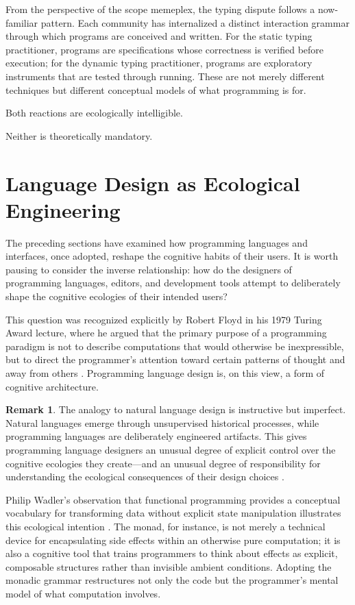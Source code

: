 \documentclass[11pt]{article}
\theoremstyle{definition}
\newtheorem{remark}{Remark}[section]
\begin{document}
From the perspective of the scope memeplex, the typing dispute follows
a now-familiar pattern. Each community has internalized a distinct
interaction grammar through which programs are conceived and written.
For the static typing practitioner, programs are specifications whose
correctness is verified before execution; for the dynamic typing
practitioner, programs are exploratory instruments that are tested
through running. These are not merely different techniques but different
conceptual models of what programming is for.

Both reactions are ecologically intelligible.

Neither is theoretically mandatory.

\section{Language Design as Ecological Engineering}

The preceding sections have examined how programming languages and
interfaces, once adopted, reshape the cognitive habits of their users.
It is worth pausing to consider the inverse relationship: how do the
designers of programming languages, editors, and development tools
attempt to deliberately shape the cognitive ecologies of their
intended users?

This question was recognized explicitly by Robert Floyd in his 1979
Turing Award lecture, where he argued that the primary purpose of a
programming paradigm is not to describe computations that would
otherwise be inexpressible, but to direct the programmer's attention
toward certain patterns of thought and away from others
\cite{floyd1979}. Programming language design is, on this view, a form
of cognitive architecture.

\begin{remark}
The analogy to natural language design is instructive but imperfect.
Natural languages emerge through unsupervised historical processes,
while programming languages are deliberately engineered artifacts.
This gives programming language designers an unusual degree of explicit
control over the cognitive ecologies they create---and an unusual degree
of responsibility for understanding the ecological consequences of their
design choices \cite{floyd1979,wadler1992}.
\end{remark}

Philip Wadler's observation that functional programming provides a
conceptual vocabulary for transforming data without explicit state
manipulation illustrates this ecological intention \cite{wadler1992}.
The monad, for instance, is not merely a technical device for
encapsulating side effects within an otherwise pure computation; it is
also a cognitive tool that trains programmers to think about effects
as explicit, composable structures rather than invisible ambient
conditions. Adopting the monadic grammar restructures not only the
code but the programmer's mental model of what computation involves.
\end{document}
